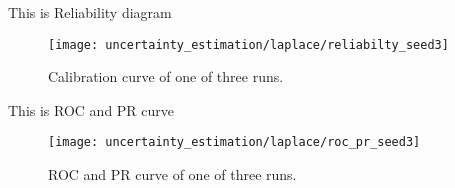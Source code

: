 This is Reliability diagram
\begin{figure}[H]
	\begin{center}
		\texttt{[image: uncertainty\_estimation/laplace/reliabilty\_seed3]}
		\caption{Calibration curve of one of three runs.}		
		\label{exp1_reliability}
	\end{center}
\end{figure}

This is ROC and PR curve
\begin{figure}[H]
	\begin{center}
		\texttt{[image: uncertainty\_estimation/laplace/roc\_pr\_seed3]}
		\caption{ROC and PR curve of one of three runs.}		
		\label{exp1_reliability}
	\end{center}
\end{figure}

